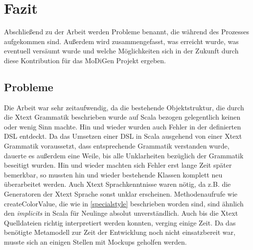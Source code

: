 \chapter{Fazit}
Abschließend zu der Arbeit werden Probleme benannt, die während des Prozesses aufgekommen sind. Außerdem wird zusammengefasst, was erreicht wurde, was eventuell versäumt wurde und welche Möglichkeiten sich in der Zukunft durch diese Kontribution für das MoDiGen Projekt ergeben.
\section{Probleme}
Die Arbeit war sehr zeitaufwendig, da die bestehende Objektstruktur, die durch die Xtext Grammatik beschrieben wurde auf Scala bezogen gelegentlich keinen oder wenig Sinn machte. Hin und wieder wurden auch Fehler in der definierten DSL entdeckt. 
Da das Umsetzen einer DSL in Scala ausgehend von einer Xtext Grammatik voraussetzt, dass entsprechende Grammatik verstanden wurde, dauerte es außerdem eine Weile, bis alle Unklarheiten bezüglich der Grammatik beseitigt wurden. Hin und wieder machten sich Fehler erst lange Zeit später bemerkbar, so mussten hin und wieder bestehende Klassen komplett neu überarbeitet werden. Auch Xtext Sprachkenntnisse waren nötig, da z.B. die Generatoren der Xtext Sprache sonst unklar erscheinen.
Methodenaufrufe wie createColorValue, die wie in \ref{specialstyle} beschrieben worden sind, sind ähnlich den \textit{implicits} in Scala für Neulinge absolut unverständlich. Auch bis die Xtext Quelldateien richtig interpretiert werden konnten, verging einige Zeit.
Da das benötigte Metamodell zur Zeit der Entwicklung noch nicht einsatzbereit war, musste sich an einigen Stellen mit Mockups geholfen werden.
